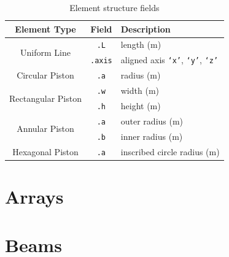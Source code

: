 \documentclass[11pt]{article}
\begin{document}
\begin{table}[!ht]
	\begin{center}
		\caption{Element structure fields}
		\label{tab:ElementFields}
		\begin{tabular}{c|c|l} 
			\textbf{Element Type} & \textbf{Field} & \textbf{Description} \\
			\hline
			\multirow{2}{*}{Uniform Line} & \texttt{.L} & length (m) \\
			& \texttt{.axis} & aligned axis \texttt{`x'}, \texttt{`y'}, \texttt{`z'} \\
			\hline
			Circular Piston & \texttt{.a} & radius (m) \\
			\hline
			\multirow{2}{*}{Rectangular Piston} & \texttt{.w} & width (m) \\
			& \texttt{.h} & height (m) \\
			\hline
			\multirow{2}{*}{Annular Piston} & \texttt{.a} & outer radius (m) \\
			& \texttt{.b} & inner radius (m) \\
			\hline
			Hexagonal Piston & \texttt{.a} & inscribed circle radius (m) \\	
		\end{tabular}
	\end{center}
\end{table}


\section{Arrays}\label{sec:array}

\section{Beams}\label{sec:beam}


\newpage


\end{document}
